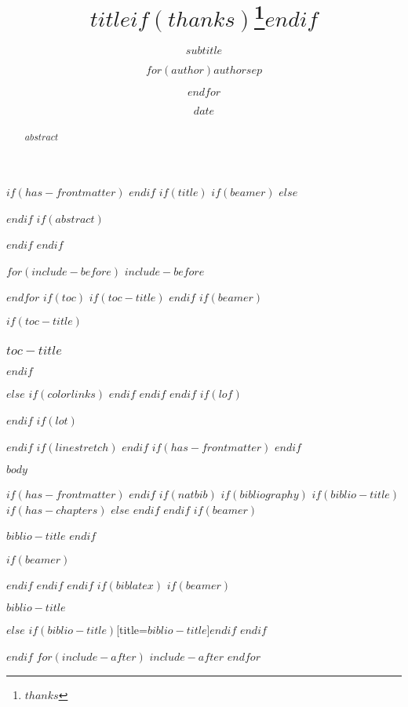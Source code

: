 \documentclass[
$if(fontsize)$
  $fontsize$,
$endif$
$if(papersize)$
  $papersize$paper,
$endif$
$if(beamer)$
  ignorenonframetext,
    $if(handout)$
        handout,
    $endif$
    $if(aspectratio)$
      aspectratio=$aspectratio$,
    $endif$
$endif$
$for(classoption)$
  $classoption$$sep$,
$endfor$
]{$documentclass$}
\title{$title$$if(thanks)$\thanks{$thanks$}$endif$}
\subtitle{$subtitle$}
\author{$for(author)$$author$$sep$ \and $endfor$}
\date{$date$}
\institute{$for(institute)$$institute$$sep$ \and $endfor$}
\newif\ifbibliography
\begin{document}
$if(has-frontmatter)$
    \frontmatter
$endif$
$if(title)$
    $if(beamer)$
        \frame{\titlepage}
    $else$
    \maketitle
    $endif$
    $if(abstract)$
        \begin{abstract}
            $abstract$
        \end{abstract}
    $endif$
$endif$

$for(include-before)$
    $include-before$

$endfor$
$if(toc)$
    $if(toc-title)$
        \renewcommand*\contentsname{$toc-title$}
    $endif$
    $if(beamer)$
        \begin{frame}[allowframebreaks]
            $if(toc-title)$
              \frametitle{$toc-title$}
            $endif$
            \tableofcontents[hideallsubsections]
        \end{frame}
    $else$
        {
        $if(colorlinks)$
            \hypersetup{linkcolor=$if(toccolor)$$toccolor$$else$$endif$}
        $endif$
        \setcounter{tocdepth}{$toc-depth$}
        \tableofcontents
        }
    $endif$
$endif$
$if(lof)$
    \listoffigures
$endif$
$if(lot)$
    \listoftables
$endif$
$if(linestretch)$
$endif$
$if(has-frontmatter)$
    \mainmatter
$endif$

$body$

$if(has-frontmatter)$
    \backmatter
$endif$
$if(natbib)$
    $if(bibliography)$
        $if(biblio-title)$
            $if(has-chapters)$
                \renewcommand\bibname{$biblio-title$}
            $else$
                \renewcommand\refname{$biblio-title$}
            $endif$
        $endif$
        $if(beamer)$
            \begin{frame}[allowframebreaks]{$biblio-title$}
              \bibliographytrue
              $endif$
              
              $if(beamer)$
            \end{frame}
        $endif$
    $endif$
$endif$
$if(biblatex)$
    $if(beamer)$
        \begin{frame}[allowframebreaks]{$biblio-title$}
          \bibliographytrue
          \printbibliography[heading=none]
        \end{frame}
    $else$
        \printbibliography$if(biblio-title)$[title=$biblio-title$]$endif$
    $endif$
    
$endif$
$for(include-after)$
    $include-after$
$endfor$
\end{document}
